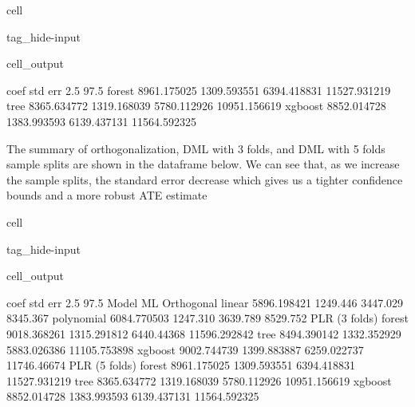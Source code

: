 \documentclass[letterpaper,10pt,english]{jupyterBook}
\begin{document}
\begin{sphinxuseclass}{cell}
\begin{sphinxuseclass}{tag_hide-input}\begin{sphinxVerbatimOutput}

\begin{sphinxuseclass}{cell_output}
\begin{sphinxVerbatim}[commandchars=\\\{\}]
                coef      std err        2.5 \PYGZpc{}        97.5 \PYGZpc{}
forest   8961.175025  1309.593551  6394.418831  11527.931219
tree     8365.634772  1319.168039  5780.112926  10951.156619
xgboost  8852.014728  1383.993593  6139.437131  11564.592325
\end{sphinxVerbatim}

\end{sphinxuseclass}\end{sphinxVerbatimOutput}

\end{sphinxuseclass}
\end{sphinxuseclass}
\sphinxAtStartPar
The summary of orthogonalization, DML with 3 folds, and DML with 5 folds sample splits are shown in the dataframe below. We can see that, as we increase the sample splits, the standard error decrease which gives us a tighter confidence bounds and a more robust ATE estimate

\begin{sphinxuseclass}{cell}
\begin{sphinxuseclass}{tag_hide-input}\begin{sphinxVerbatimOutput}

\begin{sphinxuseclass}{cell_output}
\begin{sphinxVerbatim}[commandchars=\\\{\}]
                                 coef      std err        2.5 \PYGZpc{}        97.5 \PYGZpc{}
Model         ML                                                             
Orthogonal    linear      5896.198421     1249.446     3447.029      8345.367
              polynomial  6084.770503     1247.310     3639.789      8529.752
PLR (3 folds) forest      9018.368261  1315.291812   6440.44368  11596.292842
              tree        8494.390142  1332.352929  5883.026386  11105.753898
              xgboost     9002.744739  1399.883887  6259.022737   11746.46674
PLR (5 folds) forest      8961.175025  1309.593551  6394.418831  11527.931219
              tree        8365.634772  1319.168039  5780.112926  10951.156619
              xgboost     8852.014728  1383.993593  6139.437131  11564.592325
\end{sphinxVerbatim}

\end{sphinxuseclass}\end{sphinxVerbatimOutput}

\end{sphinxuseclass}
\end{sphinxuseclass}
\end{document}
